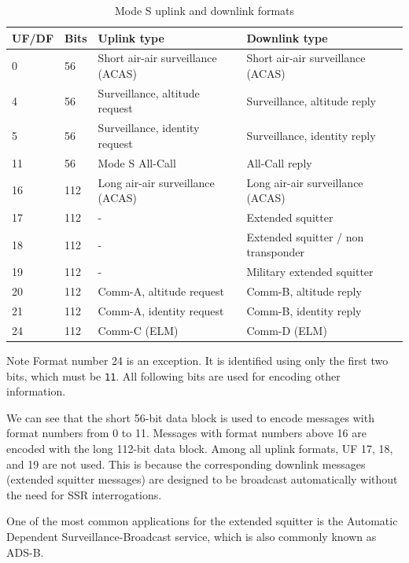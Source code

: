 \begin{table}[ht]
\centering
\footnotesize
\caption{Mode S uplink and downlink formats}
\label{tb:mode_s_formats}
\begin{tabular}{|l|l|l|l|}
\hline
\textbf{UF/DF} & \textbf{Bits} & \textbf{Uplink type} & \textbf{Downlink type} \\ \hline\hline
0 & 56 & Short air-air surveillance (ACAS) & Short air-air surveillance (ACAS) \\ \hline
4 & 56 & Surveillance, altitude request & Surveillance, altitude reply \\ \hline
5 & 56 & Surveillance, identity request & Surveillance, identity reply \\ \hline
11 & 56 & Mode S All-Call & All-Call reply \\ \hline
\hline
16 & 112 & Long air-air surveillance (ACAS) & Long air-air surveillance (ACAS) \\ \hline
17 & 112 & - & Extended squitter \\ \hline
18 & 112 & - & Extended squitter / non transponder \\ \hline
19 & 112 & - & Military extended squitter \\ \hline
20 & 112 & Comm-A, altitude request & Comm-B, altitude reply \\ \hline
21 & 112 & Comm-A, identity request & Comm-B, identity reply \\ \hline
24 & 112 & Comm-C (ELM) & Comm-D (ELM) \\ \hline
\end{tabular}
\end{table}


\begin{notebox}{Note}
  Format number 24 is an exception. It is identified using only the first two bits, which must be \texttt{11}. All following bits are used for encoding other information.
\end{notebox}


We can see that the short 56-bit data block is used to encode messages with format numbers from 0 to 11. Messages with format numbers above 16 are encoded with the long 112-bit data block. Among all uplink formats, UF 17, 18, and 19 are not used. This is because the corresponding downlink messages (extended squitter messages) are designed to be broadcast automatically without the need for SSR interrogations. 

One of the most common applications for the extended squitter is the Automatic Dependent Surveillance-Broadcast service, which is also commonly known as ADS-B.


